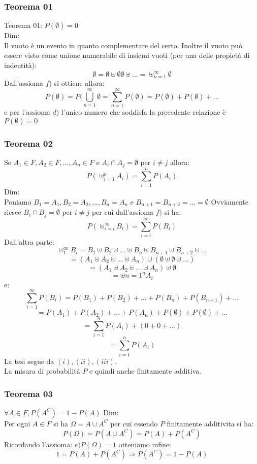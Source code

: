 \subsubsection{Teorema 01}
Teorema 01: $ P(\emptyset) = 0 $\\
Dim:\\
Il vuoto è un evento in quanto complementare del certo. Inoltre il vuoto può essere visto come unione numerabile di insiemi vuoti (per una delle propietà di indentità):
$$ \emptyset = \emptyset \uplus \emptyset \emptyset \uplus ... = \uplus_{n=1}^{\infty} \emptyset $$
Dall'assioma $f)$ si ottiene allora:
$$ P(\emptyset) = P(\bigcup_{n=1}^{\infty} \emptyset = \sum_{n=1}^{\infty} P(\emptyset) = P(\emptyset) + P(\emptyset) + ...$$
e per l'assioma $d)$ l'unico numero che soddisfa la precedente relazione è $P(\emptyset)=0$

\subsubsection{Teorema 02}
Se $A_1 \in F, A_2 \in F, ..., A_n \in F$ e $A_i \cap A_j = \emptyset$ per $i \neq j$ allora:
$$ P(\uplus_{i=1}^n A_i) = \sum_{i=1}^n P(A_i)$$
Dim:\\
Poniamo $B_1 = A_1, B_2 = A_2,...,B_n = A_n$ e $B_{n+1} = B_{n+2} = ... = \emptyset$
Ovviamente riesce $B_i \cap B_j = \emptyset$ per $i \neq j$ per cui dall'assioma $f)$ si ha:
$$ P(\uplus_{i=i}^{\infty} B_i) = \sum_{i=i}^{\infty} P(B_i)$$
Dall'altra parte:
$$ \uplus_1^{\infty} B_i = B_1 \uplus B_2 \uplus ... \uplus B_n \uplus B_{n+1} \uplus B_{n+2} \uplus ... $$
$$ = (A_1 \uplus A_2 \uplus ... \uplus A_n) \cup (\emptyset \uplus \emptyset \uplus ...) $$
$$ = (A_1 \uplus A_2 \uplus ... \uplus A_n)\uplus \emptyset $$
$$ = \uplus{n=1}^n A_i $$
e:
$$ \sum_{i=1}^{\infty} P(B_i) = P(B_1) + P(B_2) + ... + P(B_n) + P(B_{n+1}) + ... $$ 
$$ = P(A_1) + P(A_2) + ... + P(A_n) + P(\emptyset) + P(\emptyset) + ... $$
$$ = \sum_{i=1}^n P(A_i) + (0+0+...)$$
$$ = \sum_{i=1}^n P(A_i) $$
La tesi segue da $(i), (ii), (iii)$.\\
La misura di probabilità $P$ e quindi anche finitamente additiva.

\subsubsection{Teorema 03}
$\forall A \in F, P(A^C) = 1 - P(A)$
Dim: \\
Per ogni $A \in F$ si ha $\Omega = A \cup A^C $ per cui essendo $P$ finitamente additivita si ha:
$$ P(\Omega) = P(A \cup A^C) = P(A)+P(A^C)$$
Ricordando l'assioma: $e) P(\Omega)=1$ otteniamo infine:
$$ 1 = P(A)+P(A^C) \Rightarrow P(A^C) = 1 - P(A)$$

